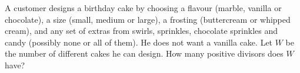 A customer designs a birthday cake by choosing a flavour (marble, vanilla or chocolate), a size (small, medium or large), a frosting (buttercream or whipped cream), and any set of extras from swirls, sprinkles, chocolate sprinkles and candy (possibly none or all of them). He does not want a vanilla cake. Let $W$ be the number of different cakes he can design. How many positive divisors does $W$ have?
